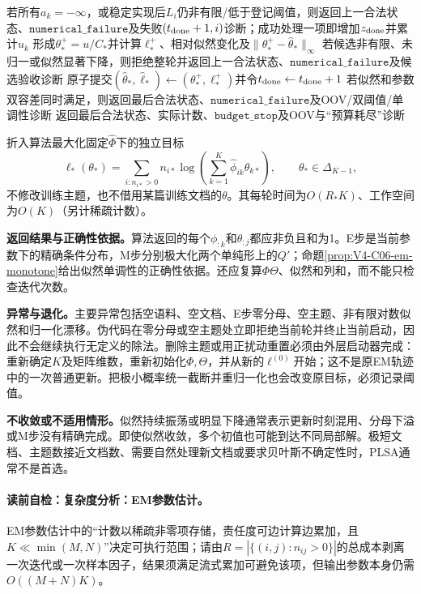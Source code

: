 \begin{AlgorithmContract}
\begin{algorithm}[tbp]
{  若所有$a_k=-\infty$，或稳定实现后$L_i$仍非有限/低于登记阈值，则返回上一合法状态、$\mathtt{numerical\_failure}$及失败$(t_{\rm done}+1,i)$诊断；成功处理一项即增加$z_{\rm done}$并累计$u_k$\;
  形成$\theta_*^+=u/C_*$并计算$\ell_*^+$、相对似然变化及$\|\theta_*^+-\widehat\theta_*\|_\infty$\;
  若候选非有限、未归一或似然显著下降，则拒绝整轮并返回上一合法状态、$\mathtt{numerical\_failure}$及候选验收诊断\;
  原子提交$(\widehat\theta_*,\widehat\ell_*)\leftarrow(\theta_*^+,\ell_*^+)$并令$t_{\rm done}\leftarrow t_{\rm done}+1$\;
  若似然和参数双容差同时满足，则返回最后合法状态、$\mathtt{numerical\_failure}$及OOV/双阈值/单调性诊断\;
}
返回最后合法状态、实际计数、$\mathtt{budget\_stop}$及OOV与“预算耗尽”诊断\;
\end{algorithm}
\end{AlgorithmContract}

折入算法最大化固定$\widehat\Phi$下的独立目标
\[
\ell_*(\theta_*)=\sum_{i:n_{i*}>0}n_{i*}
\log\!\left(\sum_{k=1}^K\widehat\phi_{ik}\theta_{k*}\right),
\qquad \theta_*\in\Delta_{K-1},
\]
不修改训练主题，也不借用某篇训练文档的$\theta$。其每轮时间为$O(R_*K)$、工作空间为$O(K)$（另计稀疏计数）。

\textbf{返回结果与正确性依据。}算法返回的每个$\phi_{:k}$和$\theta_{:j}$都应非负且和为1。E步是当前参数下的精确条件分布，M步分别极大化两个单纯形上的$Q'$；命题\ref{prop:V4-C06-em-monotone}给出似然单调性的正确性依据。还应复算$\Phi\Theta$、似然和列和，而不能只检查迭代次数。

\textbf{异常与退化。}主要异常包括空语料、空文档、E步零分母、空主题、非有限对数似然和归一化漂移。伪代码在零分母或空主题处立即拒绝当前轮并终止当前启动，因此不会继续执行无定义的除法。删除主题或用正扰动重置必须由外层启动器完成：重新确定$K$及矩阵维数，重新初始化$\Phi,\Theta$，并从新的$\ell^{(0)}$开始；这不是原EM轨迹中的一次普通更新。把极小概率统一截断并重归一化也会改变原目标，必须记录阈值。

\textbf{不收敛或不适用情形。}似然持续振荡或明显下降通常表示更新时刻混用、分母下溢或M步没有精确完成。即使似然收敛，多个初值也可能到达不同局部解。极短文档、主题数接近文档数、需要自然处理新文档或要求贝叶斯不确定性时，PLSA通常不是首选。

\label{struct:V4-C06-CH26}
\label{struct:V4-C06-CH27}
\paragraph{读前自检：复杂度分析：EM参数估计。}EM参数估计中的“计数以稀疏非零项存储，责任度可边计算边累加，且$K\ll\min(M,N)$”决定可执行范围；请由$R=|\{(i,j):n_{ij}>0\}|$的总成本剥离一次迭代或一次样本因子，结果须满足流式累加可避免该项，但输出参数本身仍需$O((M+N)K)$。\par

